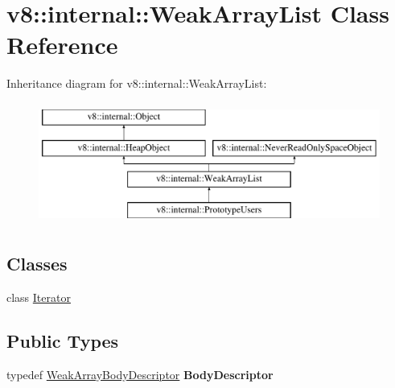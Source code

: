 \hypertarget{classv8_1_1internal_1_1WeakArrayList}{}\section{v8\+:\+:internal\+:\+:Weak\+Array\+List Class Reference}
\label{classv8_1_1internal_1_1WeakArrayList}
Inheritance diagram for v8\+:\+:internal\+:\+:Weak\+Array\+List\+:\begin{figure}[H]
\begin{center}
\leavevmode
\includegraphics[height=4.000000cm]{classv8_1_1internal_1_1WeakArrayList}
\end{center}
\end{figure}
\subsection*{Classes}
\begin{DoxyCompactItemize}
\item 
class \mbox{\hyperlink{classv8_1_1internal_1_1WeakArrayList_1_1Iterator}{Iterator}}
\end{DoxyCompactItemize}
\subsection*{Public Types}
\begin{DoxyCompactItemize}
\item 
\mbox{\label{classv8_1_1internal_1_1WeakArrayList_a099fa2ee905d2db35235b0f5e76d20a3}} 
typedef \mbox{\hyperlink{classv8_1_1internal_1_1FlexibleWeakBodyDescriptor}{Weak\+Array\+Body\+Descriptor}} {\bfseries Body\+Descriptor}
\end{DoxyCompactItemize}

